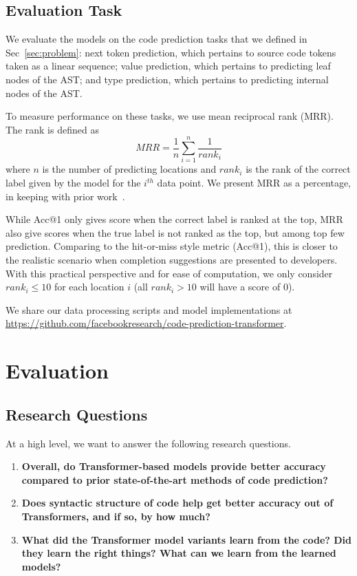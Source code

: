 \documentclass[nonacm, sigconf]{acmart}
\begin{document}
\subsection{Evaluation Task}
We evaluate the models on the code prediction tasks that we defined in Sec~\ref{sec:problem}: next token prediction, which pertains to source code tokens taken as a linear sequence; value prediction, which pertains to predicting leaf nodes of the AST; and type prediction, which pertains to predicting internal nodes of the AST.

To measure performance on these tasks, we use mean reciprocal rank (MRR). 
The rank is defined as 
\begin{equation}
    MRR = \frac{1}{n} \sum_{i = 1}^{n} \frac{1}{rank_i}
\end{equation}
where $n$ is the number of predicting locations and $rank_i$ is the rank of the correct label given by the model for the $i^{th}$ data point. We present MRR as a percentage, in keeping with prior work~\citep{karampatsis2020big-bpe,hellendoorn2017are-deep-best}.

While Acc@1 only gives score when the correct label is ranked at the top,
MRR also give scores when the true label is not ranked as the top, but among top few prediction. 
Comparing to the hit-or-miss style metric (Acc@1), this is closer to the realistic scenario when completion suggestions are presented to developers.
With this practical perspective and for ease of computation, we only consider $rank_i \le 10$ for each  location $i$ (all $rank_i > 10$ will have a score of 0).  

We share our data processing scripts and model implementations at \url{https://github.com/facebookresearch/code-prediction-transformer}. 
 
\section{Evaluation}
\label{sec:evaluation}

\subsection{Research Questions}

At a high level, we want to answer the following research questions.

\begin{enumerate}[label=RQ\arabic*]
    \item \textbf{Overall, do Transformer-based models provide better accuracy compared to prior state-of-the-art methods of code prediction?}

    \item \textbf{Does syntactic structure of code help get better accuracy out of Transformers, and if so, by how much?}

    \item  \textbf{What did the Transformer model variants learn from the code? Did they learn the right things? What can we learn from the learned models?}

\end{enumerate}
\end{document}
